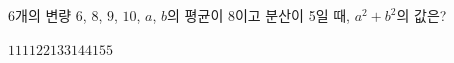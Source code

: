 6개의 변량 $6$, $8$, $9$, $10$, $a$, $b$의 평균이 8이고 분산이 5일 때, $a^2+b^2$의 값은?
\begin{choices32}{$111$}{$122$}{$133$}{$144$}{$155$}\end{choices32}
